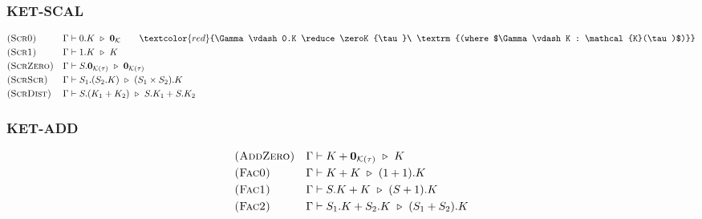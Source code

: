 \subsubsection*{\textsf{KET-SCAL}}
\begin{align*}
  & \textsc{(Scr0)} && \Gamma \vdash 0.K \reduce \textbf{0}_{\mathcal{K}}
  \qquad
  \textcolor{red}{\Gamma \vdash 0.K \reduce \zeroK{\tau}\ \textrm{(where $\Gamma \vdash K : \mathcal{K}(\tau)$)}} \\
  & \textsc{(Scr1)} && \Gamma \vdash 1.K \reduce K \\
  & \textsc{(ScrZero)} && \Gamma \vdash S.\zeroK{\tau} \reduce \zeroK{\tau} \\
  & \textsc{(ScrScr)} && \Gamma \vdash S_1.(S_2.K) \reduce (S_1 \times S_2).K \\
  & \textsc{(ScrDist)} && \Gamma \vdash S.(K_1 + K_2) \reduce S.K_1 + S.K_2
\end{align*}

\subsubsection*{\textsf{KET-ADD}}
\begin{align*}
  & \textsc{(AddZero)} && \Gamma \vdash K + \mathbf{0}_{\mathcal{K}(\tau)} \ \triangleright\  K \\
  & \textsc{(Fac0)} && \Gamma \vdash K + K \ \triangleright\  (1 + 1).K \\
  & \textsc{(Fac1)} && \Gamma \vdash S.K + K \ \triangleright\  (S + 1).K \\
  & \textsc{(Fac2)} && \Gamma \vdash S_1.K + S_2.K \ \triangleright\  (S_1 + S_2).K
\end{align*}

